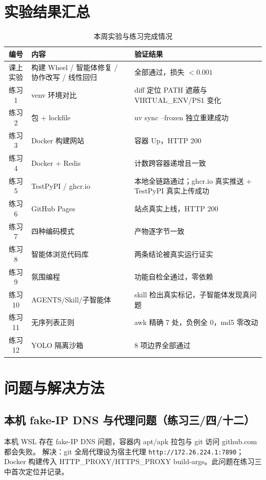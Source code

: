 \documentclass[UTF8]{ctexart}
\begin{document}

\section{实验结果汇总}

\begin{table}[H]
\centering
\caption{本周实验与练习完成情况}
\label{tab:summary}
\begin{tabular}{clp{6.2cm}}
\toprule
编号 & 内容 & 验证结果 \\
\midrule
课上实验 & 构建 Wheel / 智能体修复 / 协作改写 / 线性回归 & 全部通过，损失 $<0.001$ \\
练习 1 & venv 环境对比 & diff 定位 PATH 遮蔽与 VIRTUAL\_ENV/PS1 变化 \\
练习 2 & 包 + lockfile & uv sync --frozen 独立重建成功 \\
练习 3 & Docker 构建网站 & 容器 Up，HTTP 200 \\
练习 4 & Docker + Redis & 计数跨容器递增且一致 \\
练习 5 & TestPyPI / ghcr.io & 本地全链路通过；ghcr.io 真实推送 + TestPyPI 真实上传成功 \\
练习 6 & GitHub Pages & 站点真实上线，HTTP 200 \\
练习 7 & 四种编码模式 & 产物逐字节一致 \\
练习 8 & 智能体浏览代码库 & 两条结论被真实运行证实 \\
练习 9 & 氛围编程 & 功能自检全通过，零依赖 \\
练习 10 & AGENTS/Skill/子智能体 & skill 检出真实标记，子智能体发现真问题 \\
练习 11 & 无序列表正则 & awk 精确 7 处，负例全 0，md5 零改动 \\
练习 12 & YOLO 隔离沙箱 & 8 项边界全部通过 \\
\bottomrule
\end{tabular}
\end{table}

\section{问题与解决方法}

\subsection{本机 fake-IP DNS 与代理问题（练习三/四/十二）}

本机 WSL 存在 fake-IP DNS 问题，容器内 apt/apk 拉包与 git 访问 github.com 都会失败。
解决：git 全局代理设为宿主代理 \texttt{http://172.26.224.1:7890}；Docker 构建传入
HTTP\_PROXY/HTTPS\_PROXY build-args。此问题在练习三中首次定位并记录。
\end{document}
